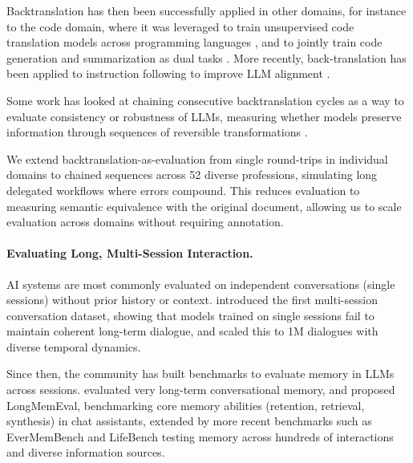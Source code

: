 \documentclass{article} %
\begin{document}
Backtranslation has then been successfully applied in other domains, for instance to the code domain, where it was leveraged to train unsupervised code translation models across programming languages \citep{Lachaux2020UnsupervisedTO,Rozière2021LeveragingAU}, and to jointly train code generation and summarization as dual tasks \citep{Wei2019CodeGA}. More recently, back-translation has been applied to instruction following to improve LLM alignment \citep{Li2023SelfAlignmentWI,Nguyen2024BetterAW}.

Some work has looked at chaining consecutive backtranslation cycles as a way to evaluate consistency or robustness of LLMs, measuring whether models preserve information through sequences of reversible transformations \citep{Hong2025ConsistencyCheckerTE,Min2023BeyondAE,Allamanis2024UnsupervisedEO,Maveli2026CanLC}.

We extend backtranslation-as-evaluation \citep{Zhuo2022RethinkingRT,Allamanis2024UnsupervisedEO} from single round-trips in individual domains to chained sequences across 52 diverse professions, simulating long delegated workflows where errors compound. This reduces evaluation to measuring semantic equivalence with the original document, allowing us to scale evaluation across domains without requiring annotation.

\paragraph{Evaluating Long, Multi-Session Interaction.}

AI systems are most commonly evaluated on independent conversations (single sessions) without prior history or context. \citet{Xu2021BeyondGM} introduced the first multi-session conversation dataset, showing that models trained on single sessions fail to maintain coherent long-term dialogue, and \citet{Jang2023ConversationCT} scaled this to 1M dialogues with diverse temporal dynamics.

Since then, the community has built benchmarks to evaluate memory in LLMs across sessions. \citet{Maharana2024EvaluatingVL} evaluated very long-term conversational memory, and \citet{Wu2024LongMemEvalBC} proposed LongMemEval, benchmarking core memory abilities (retention, retrieval, synthesis) in chat assistants, extended by more recent benchmarks such as EverMemBench \citep{Hu2026EverMemBenchBL} and LifeBench \citep{Cheng2026LifeBenchAB} testing memory across hundreds of interactions and diverse information sources.
\end{document}
